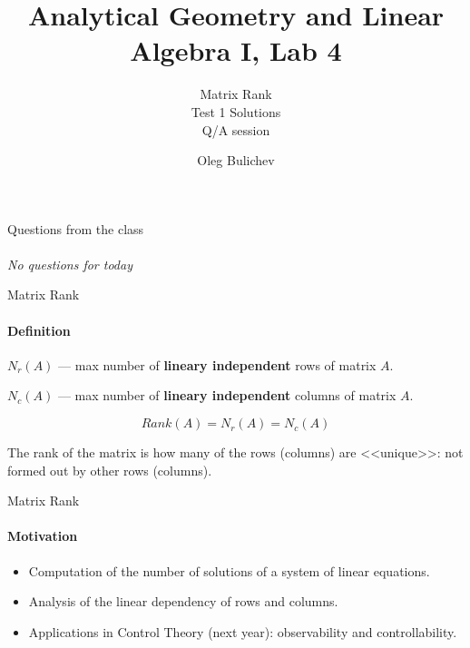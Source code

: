 \documentclass[aspectratio=169,notes]{beamer}
\title[AGLA1]{Analytical Geometry and Linear Algebra I, Lab 4} %
\subtitle{Matrix Rank \\ Test 1 Solutions \\ Q/A session   
         } %
\author{Oleg Bulichev}
\newcommand{\fbckg}[1]{\usebackgroundtemplate{\texttt{[image: \#1]}}}%
\begin{document}
\setlength{\abovedisplayskip}{0pt}
\setlength{\belowdisplayskip}{0pt}
\setlength{\abovedisplayshortskip}{0pt}
\setlength{\belowdisplayshortskip}{0pt}

\fbckg{fibeamer/figs/title_page.png}

\fbckg{fibeamer/figs/common.png}


\begin{frame}[c]{Questions from the class}
\framesubtitle{}
\centering
    \textit{ \Large No questions for today}
\end{frame}

\begin{frame}[t]{Matrix Rank}
    \framesubtitle{Definition}
        \textbf{$N_r(A)$} --- max number of \textbf{lineary independent} rows of matrix $A$.
    
        \textbf{$N_c(A)$} --- max number of \textbf{lineary independent} columns of matrix $A$.
    
        \begin{equation*}
            Rank(A) = N_r(A) = N_c(A)
        \end{equation*}
    \bigskip
    
        \centering
        The rank of the matrix is how many of the rows (columns) are <<unique>>: not formed out by other rows (columns).
    \end{frame}
    
    \begin{frame}[t]{Matrix Rank}
    \framesubtitle{Motivation}
        \begin{itemize}
            \item Computation of the number of solutions of a system of linear equations.
            \item Analysis of the linear dependency of rows and columns.
            \item Applications in Control Theory (next year): observability and controllability.
        \end{itemize}
    \end{frame}
    
\end{document}
